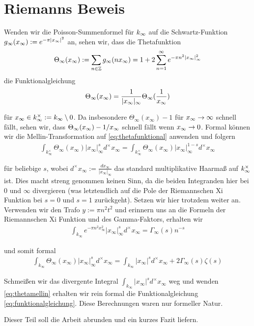\section{Riemanns Beweis}
\label{sec:kapitel3}

Wenden wir die Poisson-Summenformel f\" ur $k_\infty$ auf die Schwartz-Funktion $g_\infty(x_\infty):=e^{-\pi|x_\infty|^2}$ an, sehen wir, dass die Thetafunktion
\begin{align}
	\Theta_\infty (x_\infty):=\sum_{n\in\mathbb{Z}}{g_\infty (nx_\infty)} = 1+ 2\sum_{n=1}^\infty{e^{-\pi n^2 |x_\infty|_\infty^2}}
\end{align}
die Funktionalgleichung
\begin{align}
	\label{eq:thetafunktional}
	\Theta_\infty (x_\infty) = \frac{1}{|x_\infty|_\infty} \Theta_\infty(\frac{1}{x_\infty})
\end{align}

f\"ur $x_\infty \in k_\infty^\times :=k_\infty\setminus{0}$. Da insbesondere $\Theta_\infty(x_\infty)-1$ f\"ur $x_\infty \rightarrow \infty$ schnell f\"allt, sehen wir, dass $\Theta_\infty(x_\infty) - 1 / x_\infty$ schnell f\"allt wenn $x_\infty \rightarrow 0$. 
Formal k\"onnen wir die Mellin-Transformation auf \eqref{eq:thetafunktional} anwenden und folgern
\begin{align}
	\label{eq:thetamellin}
	\int_{k_\infty^\times} \Theta_\infty(x_\infty) |x_\infty|_\infty^s d^\times x_\infty = \int_{k_\infty^\times} \Theta_\infty(x_\infty) |x_\infty|_\infty^{1-s} d^\times x_\infty
\end{align}

f\"ur beliebige $s$, wobei $d^\times x_\infty := \frac{dx_\infty}{|x_\infty|_\infty}$ das standard multiplikative Haarma{\ss} auf $k_\infty^\times$ ist. Dies macht streng genommen keinen Sinn, da die beiden Integranden hier bei $0$ und $\infty$ divergieren (was letztendlich auf die Pole der Riemannschen Xi Funktion bei $s=0$ und $s=1$ zur\"uckgeht). Setzen wir hier trotzdem weiter an. Verwenden wir den Trafo $y := \pi n^2 t^2$ und erinnern uns an die Formeln der Riemannschen Xi Funktion und des Gamma-Faktors, erhalten wir
\begin{align}
	 \int_{k_\infty}e^{-\pi n^2 x_\infty^2} |x_\infty|_\infty^s d^\times x_\infty = \Gamma_\infty(s) n^{-s}
\end{align}

und somit formal
\begin{align}
	\int_{k_\infty} \Theta_\infty(x_\infty) |x_\infty|_\infty^s d^\times x_\infty = \int_{k_\infty} |x_\infty|^s d^\times x_\infty + 2\Gamma_\infty(s) \zeta(s)
\end{align}

Schmei{\ss}en wir das divergente Integral $\int_{k_\infty} |x_\infty|^s d^\times x_\infty$ weg und wenden \eqref{eq:thetamellin} erhalten wir rein formal die Funktionalgleichung \eqref{eq:funktionalgleichung}. Diese Berechnungen waren nur formeller Natur.

Dieser Teil soll die Arbeit abrunden und ein kurzes Fazit liefern.